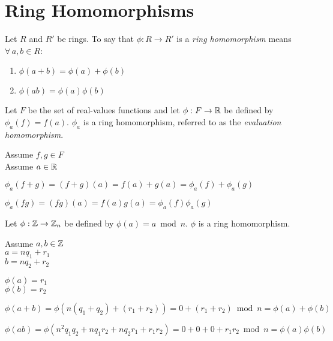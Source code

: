 \documentclass[letterpaper,12pt,fleqn]{article}
\begin{document}
\section*{Ring Homomorphisms}

\begin{definition}
  Let $R$ and $R'$ be rings. To say that $\phi:R\to R'$ is a
  \emph{ring homomorphism} means $\forall\,a,b\in R$:
  \begin{enumerate}
  \item $\phi(a+b)=\phi(a)+\phi(b)$
  \item $\phi(ab)=\phi(a)\phi(b)$
  \end{enumerate}
\end{definition}

\begin{theorem}
  Let $F$ be the set of real-values functions and let $\phi:F\to\mathbb{R}$ be defined
  by $\phi_a(f)=f(a)$. $\phi_a$ is a ring homomorphism, referred to as the
  \emph{evaluation homomorphism}.
\end{theorem}

\begin{theproof}
  Assume $f,g\in F$ \\
  Assume $a\in\mathbb{R}$

  $\phi_a(f+g)=(f+g)(a)=f(a)+g(a)=\phi_a(f)+\phi_a(g)$

  $\phi_a(fg)=(fg)(a)=f(a)g(a)=\phi_a(f)\phi_a(g)$
\end{theproof}

\begin{theorem}
  Let $\phi:\mathbb{Z}\to\mathbb{Z}_n$ be defined by $\phi(a)=a\bmod n$. $\phi$ is a ring
  homomorphism.
\end{theorem}

\begin{theproof}
  Assume $a,b\in\mathbb{Z}$ \\
  $a=nq_1+r_1$ \\
  $b=nq_2+r_2$

  $\phi(a)=r_1$ \\
  $\phi(b)=r_2$

  $\phi(a+b)=\phi(n(q_1+q_2)+(r_1+r_2))=0+(r_1+r_2)\bmod n=\phi(a)+\phi(b)$

  $\phi(ab)=\phi(n^2q_1q_2+nq_1r_2+nq_2r_1+r_1r_2)=0+0+0+r_1r_2\bmod n=
  \phi(a)\phi(b)$
\end{theproof}
\end{document}
